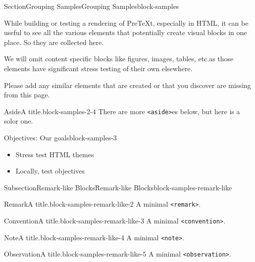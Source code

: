 \documentclass[twoside,10pt,]{article}
\newcommand{\mono}[1]{\texttt{#1}}
\numberwithin{equation}{section}
\begin{document}
%
%
\typeout{************************************************}
\typeout{************************************************}
%
\begin{sectionptx}{Section}{Grouping Samples}{}{Grouping Samples}{}{}{block-samples}
\begin{introduction}{}%
While building or testing a rendering of PreTeXt, especially in HTML, it can be useful to see all the various elements that potentially create visual blocks in one place. So they are collected here.%
\par
We will omit content specific blocks like figures, images, tables, etc.\@ as those elements have significant stress testing of their own elsewhere.%
\par
Please add any similar elements that are created or that you discover are missing from this page.%
\begin{aside}{Aside}{A title.}{block-samples-2-4}%
There are more \mono{<aside>}es below, but here is a solor one.%
\end{aside}
\end{introduction}%
\begin{objectives}{Objectives: Our goals}{block-samples-3}
%
\begin{itemize}[label=\textbullet]
\item{}Stress test HTML themes%
\item{}Locally, test objectives%
\end{itemize}
\end{objectives}
%
%
\typeout{************************************************}
\typeout{************************************************}
%
\begin{subsectionptx}{Subsection}{Remark-like Blocks}{}{Remark-like Blocks}{}{}{block-samples-remark-like}
\begin{remark}{Remark}{A title.}{block-samples-remark-like-2}%
A minimal \mono{<remark>}.%
\end{remark}
\begin{convention}{Convention}{A title.}{block-samples-remark-like-3}%
A minimal \mono{<convention>}.%
\end{convention}
\begin{note}{Note}{A title.}{block-samples-remark-like-4}%
A minimal \mono{<note>}.%
\end{note}
\begin{observation}{Observation}{A title.}{block-samples-remark-like-5}%
A minimal \mono{<observation>}.%

\end{observation}
\end{subsectionptx}
\end{sectionptx}
\end{document}
